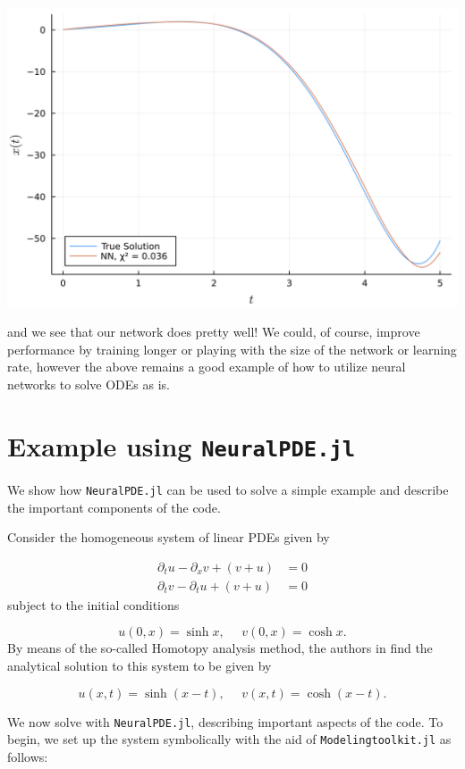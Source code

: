 \documentclass{CUP-JNL-DTM}%
\theoremstyle{definition}
\numberwithin{equation}{section}
\begin{document}
\begin{center}
\includegraphics[width=0.42\linewidth]{figures/ODE_example.png}
\end{center}
and we see that our network does pretty well! We could, of course, improve performance by training longer or playing with the size of the network or learning rate, however the above remains a good example of how to utilize neural networks to solve ODEs as is. 

\section{Example using \texttt{NeuralPDE.jl}}
\label{neural_PDE_eg}

We show how \texttt{NeuralPDE.jl} can be used to solve a simple example and describe the important components of the code. 

Consider the homogeneous system of linear PDEs given by

\begin{equation}
\begin{split}
	\partial_t u - \partial_x v + (v + u) & = 0 \\
	\partial_t v - \partial_t u + (v + u) & = 0
\end{split}
\end{equation}
subject to the initial conditions 

\begin{equation}
	u(0,x) = \sinh x, \,\,\,\,\,\,\,\, v(0,x) = \cosh x. 
\end{equation}    
By means of the so-called Homotopy analysis method, the authors in \cite{samibatainehApproximateAnalyticalSolutions2008} find the analytical solution to this system to be given by 

\begin{equation}
	u(x,t) = \sinh(x - t), \,\,\,\,\,\,\,\, v(x,t) = \cosh(x - t). 
\end{equation}

We now solve with \texttt{NeuralPDE.jl}, describing important aspects of the code. To begin, we set up the system symbolically with the aid of \texttt{Modelingtoolkit.jl} as follows:
\end{document}
